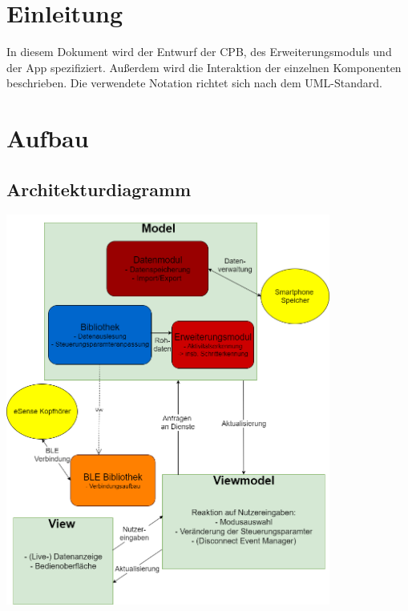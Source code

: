 \documentclass[a4paper,12pt]{article}
\title{\projektName}
\date{\today}
\author{Tec O'Brain}
\begin{document}
 \setcounter{page}{2}
 \tableofcontents          %
 \clearpage

\section{Einleitung}
In diesem Dokument wird der Entwurf der \Gls{CPB}, des Erweiterungsmoduls und der App spezifiziert. Außerdem wird die Interaktion der einzelnen Komponenten beschrieben.
Die verwendete Notation richtet sich nach dem UML-Standard.

\section{Aufbau}
	\subsection{Architekturdiagramm}
	\begin{center}
		\vspace{100px}
		\includegraphics[width=0.8\textwidth]{./Diagramme/Achi5.png}
	\end{center}
	\clearpage %
\end{document}
